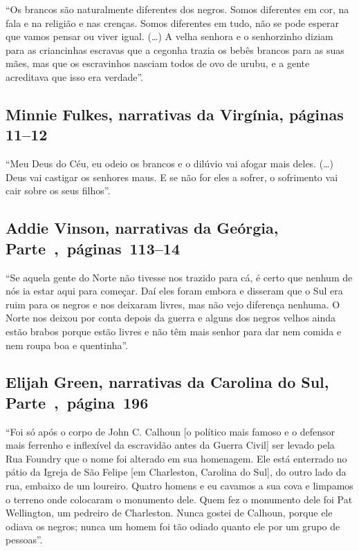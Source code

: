``Os brancos são naturalmente diferentes dos negros. Somos diferentes em
cor, na fala e na religião e nas crenças. Somos diferentes em tudo, não
se pode esperar que vamos pensar ou viver igual. (\ldots{}) A velha
senhora e o senhorzinho diziam para as criancinhas escravas que a
cegonha trazia os bebês brancos para as suas mães, mas que os
escravinhos nasciam todos de ovo de urubu, e a gente acreditava que isso
era verdade''.

\subsection{Minnie Fulkes, narrativas da Virgínia, páginas 11--12} \label{ref95}

``Meu Deus do Céu, eu odeio os brancos e o dilúvio vai afogar mais
deles. (\ldots{}) Deus vai castigar os senhores maus. E se não for eles
a sofrer, o sofrimento vai cair sobre os seus filhos''.

\subsection{Addie Vinson, narrativas da Geórgia, Parte~,~páginas~113--14}
\label{ref270}

``Se aquela gente do Norte não tivesse nos trazido para cá, é certo que
nenhum de nós ia estar aqui para começar. Daí eles foram embora e
disseram que o Sul era ruim para os negros e nos deixaram livres, mas
não vejo diferença nenhuma. O Norte nos deixou por conta depois da
guerra e alguns dos negros velhos ainda estão brabos porque estão livres
e não têm mais senhor para dar nem comida e nem roupa boa e quentinha''.

\subsection{Elijah Green, narrativas da Carolina do Sul, Parte~,~página~196}
\label{ref111}


``Foi só após o corpo de John C. Calhoun {[}o político mais famoso e o
defensor mais ferrenho e inflexível da escravidão antes da Guerra
Civil{]} ser levado pela Rua Foundry que o nome foi alterado em sua
homenagem. Ele está enterrado no pátio da Igreja de São Felipe {[}em
Charleston, Carolina do Sul{]}, do outro lado da rua, embaixo de um
loureiro. Quatro homens e eu cavamos a sua cova e limpamos o terreno
onde colocaram o monumento dele. Quem fez o monumento dele foi Pat
Wellington, um pedreiro de Charleston. Nunca gostei de Calhoun, porque
ele odiava os negros; nunca um homem foi tão odiado quanto ele por um
grupo de pessoas''.

